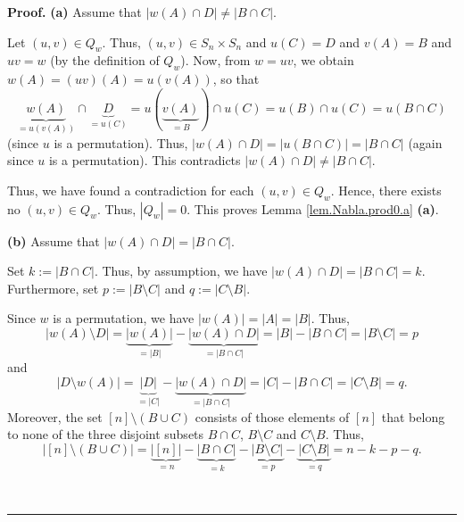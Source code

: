\documentclass[numbers=enddot,12pt,final,onecolumn,notitlepage]{scrartcl}%
\numberwithin{exer}{subsection}
\theoremstyle{definition}
\newenvironment{proof}[1][Proof]{\noindent\textbf{#1.} }{\ \rule{0.5em}{0.5em}}
\begin{document}
\begin{proof}
\textbf{(a)} Assume that $\left\vert w\left(  A\right)  \cap D\right\vert
\neq\left\vert B\cap C\right\vert $.

Let $\left(  u,v\right)  \in Q_{w}$. Thus, $\left(  u,v\right)  \in
S_{n}\times S_{n}$ and $u\left(  C\right)  =D$ and $v\left(  A\right)  =B$ and
$uv=w$ (by the definition of $Q_{w}$). Now, from $w=uv$, we obtain $w\left(
A\right)  =\left(  uv\right)  \left(  A\right)  =u\left(  v\left(  A\right)
\right)  $, so that
\[
\underbrace{w\left(  A\right)  }_{=u\left(  v\left(  A\right)  \right)  }%
\cap\underbrace{D}_{=u\left(  C\right)  }=u\left(  \underbrace{v\left(
A\right)  }_{=B}\right)  \cap u\left(  C\right)  =u\left(  B\right)  \cap
u\left(  C\right)  =u\left(  B\cap C\right)
\]
(since $u$ is a permutation). Thus, $\left\vert w\left(  A\right)  \cap
D\right\vert =\left\vert u\left(  B\cap C\right)  \right\vert =\left\vert
B\cap C\right\vert $ (again since $u$ is a permutation). This contradicts
$\left\vert w\left(  A\right)  \cap D\right\vert \neq\left\vert B\cap
C\right\vert $.

Thus, we have found a contradiction for each $\left(  u,v\right)  \in Q_{w}$.
Hence, there exists no $\left(  u,v\right)  \in Q_{w}$. Thus, $\left\vert
Q_{w}\right\vert =0$. This proves Lemma \ref{lem.Nabla.prod0.a} \textbf{(a)}.
\medskip

\textbf{(b)} Assume that $\left\vert w\left(  A\right)  \cap D\right\vert
=\left\vert B\cap C\right\vert $.

Set $k:=\left\vert B\cap C\right\vert $. Thus, by assumption, we have
$\left\vert w\left(  A\right)  \cap D\right\vert =\left\vert B\cap
C\right\vert =k$. Furthermore, set $p:=\left\vert B\setminus C\right\vert $
and $q:=\left\vert C\setminus B\right\vert $.

Since $w$ is a permutation, we have $\left\vert w\left(  A\right)  \right\vert
=\left\vert A\right\vert =\left\vert B\right\vert $. Thus,%
\[
\left\vert w\left(  A\right)  \setminus D\right\vert =\underbrace{\left\vert
w\left(  A\right)  \right\vert }_{=\left\vert B\right\vert }%
-\underbrace{\left\vert w\left(  A\right)  \cap D\right\vert }_{=\left\vert
B\cap C\right\vert }=\left\vert B\right\vert -\left\vert B\cap C\right\vert
=\left\vert B\setminus C\right\vert =p
\]
and%
\[
\left\vert D\setminus w\left(  A\right)  \right\vert =\underbrace{\left\vert
D\right\vert }_{=\left\vert C\right\vert }-\underbrace{\left\vert w\left(
A\right)  \cap D\right\vert }_{=\left\vert B\cap C\right\vert }=\left\vert
C\right\vert -\left\vert B\cap C\right\vert =\left\vert C\setminus
B\right\vert =q.
\]
Moreover, the set $\left[  n\right]  \setminus\left(  B\cup C\right)  $
consists of those elements of $\left[  n\right]  $ that belong to none of the
three disjoint subsets $B\cap C$, $B\setminus C$ and $C\setminus B$. Thus,
\[
\left\vert \left[  n\right]  \setminus\left(  B\cup C\right)  \right\vert
=\underbrace{\left\vert \left[  n\right]  \right\vert }_{=n}%
-\underbrace{\left\vert B\cap C\right\vert }_{=k}-\underbrace{\left\vert
B\setminus C\right\vert }_{=p}-\underbrace{\left\vert C\setminus B\right\vert
}_{=q}=n-k-p-q.
\]



\end{proof}
\end{document}
